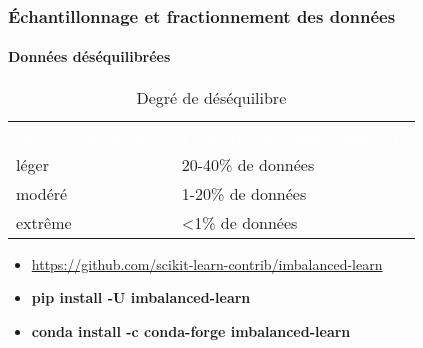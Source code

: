 \documentclass[xcolor=table]{beamer}
\begin{document}
\begin{frame}
	\frametitle{Échantillonnage et fractionnement des données}
	\framesubtitle{Données déséquilibrées}
	
	\begin{table}
		\begin{tabular}{p{}p{}}
			\rowcolor{darkblue}
			\textcolor{white}{Degré de déséquilibre} & \textcolor{white}{Proportion de classe minoritaire} \\
			léger & 20-40\% de données \\
			modéré & 1-20\% de données \\
			extrême &	\textless 1\% de données \\
		\end{tabular}
		\caption{Degré de déséquilibre \cite{2021-google-prep}}
	\end{table}

	\begin{itemize}
		\item \url{https://github.com/scikit-learn-contrib/imbalanced-learn}
		\item \textbf{pip install -U imbalanced-learn}
		\item \textbf{conda install -c conda-forge imbalanced-learn}
	\end{itemize}
	
\end{frame}
\end{document}
